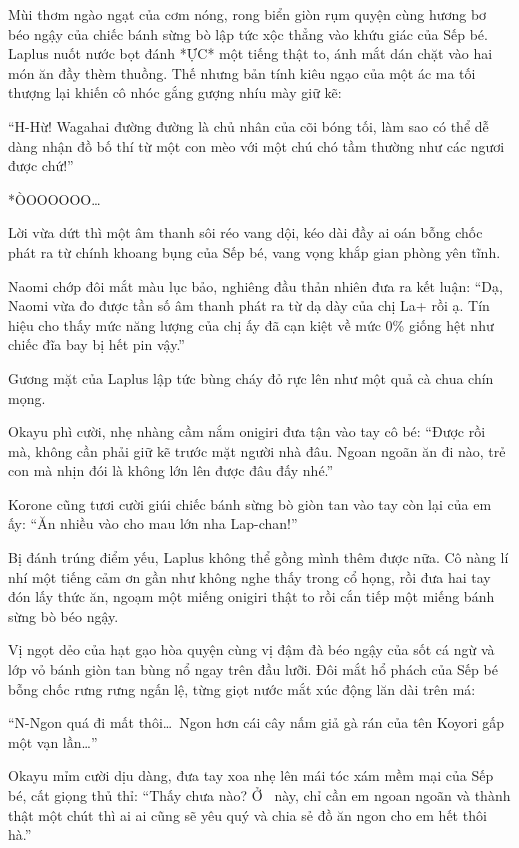 \documentclass[../main.tex]{subfiles}
\begin{document}
Mùi thơm ngào ngạt của cơm nóng, rong biển giòn rụm quyện cùng hương bơ béo ngậy của chiếc bánh sừng bò lập tức xộc thẳng vào khứu giác của Sếp bé. Laplus nuốt nước bọt đánh *ỰC* một tiếng thật to, ánh mắt dán chặt vào hai món ăn đầy thèm thuồng. Thế nhưng bản tính kiêu ngạo của một ác ma tối thượng lại khiến cô nhóc gắng gượng nhíu mày giữ kẽ:

``H-Hừ! Wagahai đường đường là chủ nhân của cõi bóng tối, làm sao có thể dễ dàng nhận đồ bố thí từ một con mèo với một chú chó tầm thường như các ngươi được chứ!''

*ÒOOOOOO\dots*

Lời vừa dứt thì một âm thanh sôi réo vang dội, kéo dài đầy ai oán bỗng chốc phát ra từ chính khoang bụng của Sếp bé, vang vọng khắp gian phòng yên tĩnh.

Naomi chớp đôi mắt màu lục bảo, nghiêng đầu thản nhiên đưa ra kết luận: ``Dạ, Naomi vừa đo được tần số âm thanh phát ra từ dạ dày của chị La+ rồi ạ. Tín hiệu cho thấy mức năng lượng của chị ấy đã cạn kiệt về mức 0\% giống hệt như chiếc đĩa bay bị hết pin vậy.''

Gương mặt của Laplus lập tức bùng cháy đỏ rực lên như một quả cà chua chín mọng.

Okayu phì cười, nhẹ nhàng cầm nắm onigiri đưa tận vào tay cô bé: ``Được rồi mà, không cần phải giữ kẽ trước mặt người nhà đâu. Ngoan ngoãn ăn đi nào, trẻ con mà nhịn đói là không lớn lên được đâu đấy nhé.''

Korone cũng tươi cười giúi chiếc bánh sừng bò giòn tan vào tay còn lại của em ấy: ``Ăn nhiều vào cho mau lớn nha Lap-chan!''

Bị đánh trúng điểm yếu, Laplus không thể gồng mình thêm được nữa. Cô nàng lí nhí một tiếng cảm ơn gần như không nghe thấy trong cổ họng, rồi đưa hai tay đón lấy thức ăn, ngoạm một miếng onigiri thật to rồi cắn tiếp một miếng bánh sừng bò béo ngậy.

Vị ngọt dẻo của hạt gạo hòa quyện cùng vị đậm đà béo ngậy của sốt cá ngừ và lớp vỏ bánh giòn tan bùng nổ ngay trên đầu lưỡi. Đôi mắt hổ phách của Sếp bé bỗng chốc rưng rưng ngấn lệ, từng giọt nước mắt xúc động lăn dài trên má:

``N-Ngon quá đi mất thôi\dots\ Ngon hơn cái cây nấm giả gà rán của tên Koyori gấp một vạn lần\dots''

Okayu mỉm cười dịu dàng, đưa tay xoa nhẹ lên mái tóc xám mềm mại của Sếp bé, cất giọng thủ thỉ: ``Thấy chưa nào? Ở \hll\ này, chỉ cần em ngoan ngoãn và thành thật một chút thì ai ai cũng sẽ yêu quý và chia sẻ đồ ăn ngon cho em hết thôi hà.''
\end{document}
